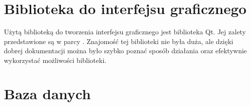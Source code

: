 \section{Biblioteka do interfejsu graficznego}
\label{sec:interfejsGraficzny}
Użytą biblioteką do tworzenia interfejsu graficznego jest biblioteka Qt. Jej zalety przedstawione są w parcy \cite{Gl11}. Znajomość tej biblioteki nie była duża, ale dzięki dobrej dokumentacji można było szybko poznać sposób działania oraz efektywnie wykorzystać możliwości biblioteki.

\section{Baza danych}
\label{sec:bazaDanych}

